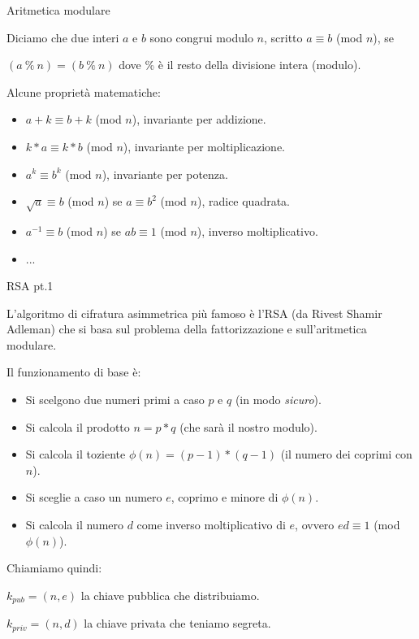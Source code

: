 \documentclass[xcolor=dvipsnames,aspectratio=169]{beamer}
\begin{document}
\begin{frame}{Aritmetica modulare}

Diciamo che due interi $a$ e $b$ sono congrui modulo $n$, scritto $a \equiv b$ (mod $n$), se

$(a\ \%\ n) = (b\ \%\ n)$ dove \% è il resto della divisione intera (modulo).

\medskip

\pause

Alcune proprietà matematiche:

\pause

\begin{itemize}
  \item $a + k\equiv b + k$ (mod $n$), invariante per addizione.
  \item $k*a \equiv k*b$ (mod $n$), invariante per moltiplicazione.
  \item $a^k \equiv b^k$ (mod $n$), invariante per potenza.\pause
  \item $\sqrt{a} \equiv b$ (mod $n$) se $a \equiv b^2$ (mod $n$), radice quadrata.
  \item $a^{-1} \equiv b$ (mod $n$) se $ab \equiv 1$ (mod $n$), inverso moltiplicativo.
  \item ...
\end{itemize}

\end{frame}

\begin{frame}{RSA pt.1}

\pause

L'algoritmo di cifratura asimmetrica più famoso è l'RSA (da {\color{red}R}ivest {\color{red}S}hamir {\color{red}A}dleman) che si basa sul problema della fattorizzazione e sull'aritmetica modulare.

\pause

\smallskip

Il funzionamento di base è:\pause

\begin{itemize}
  \item Si scelgono due numeri primi a caso $p$ e $q$ (in modo \textit{sicuro}).\pause
  \item Si calcola il prodotto $n = p*q$ (che sarà il nostro modulo).\pause
  \item Si calcola il toziente $\phi(n) = (p-1)*(q-1)$ (il numero dei coprimi con $n$).\pause
  \item Si sceglie a caso un numero $e$, coprimo e minore di $\phi(n)$.\pause
  \item Si calcola il numero $d$ come inverso moltiplicativo di $e$, ovvero $ed \equiv 1$ (mod $\phi(n)$).
\end{itemize}

\medskip

\pause

Chiamiamo quindi:

\pause

$k_{pub} = (n, e)$ la chiave pubblica che distribuiamo.

\pause

$k_{priv} = (n, d)$ la chiave privata che teniamo segreta.

\end{frame}
\end{document}
